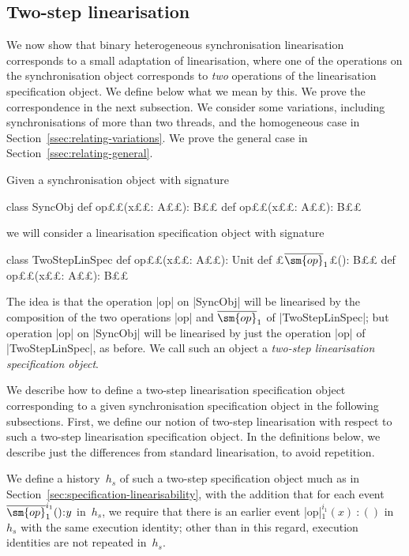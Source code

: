 
\subsection{Two-step linearisation}

We now show that binary heterogeneous synchronisation linearisation
corresponds to a small adaptation of linearisation, where one of the
operations on the synchronisation object corresponds to \emph{two} operations
of the linearisation specification object.  We define below what we mean by
this.  We prove the correspondence in the next subsection.  We consider some
variations, including synchronisations of more than two threads, and the
homogeneous case in Section~\ref{ssec:relating-variations}.  We prove the
general case in Section~\ref{ssec:relating-general}.

Given a synchronisation object with signature
\begin{scala}
class SyncObj{
  def op££(x££: A££): B££
  def op££(x££: A££): B££
}
\end{scala}
we will consider a linearisation specification object with signature
%
\begin{scala}
class TwoStepLinSpec{
  def op££(x££: A££): Unit
  def £$\overline{\sm{op}}_1$£(): B££
  def op££(x££: A££): B££
}
\end{scala}
%
The idea is that the operation |op| on |SyncObj| will be linearised by the
composition of the two operations |op| and $\overline{\sm{op}}_1$ of
|TwoStepLinSpec|; but operation |op| on |SyncObj| will be linearised by
just the operation |op| of |TwoStepLinSpec|, as before.  We call such an
object a \emph{two-step linearisation specification object}.  

We describe how to define a two-step linearisation specification object
corresponding to a given synchronisation specification object in the following
subsections.  First, we define our notion of two-step linearisation with
respect to such a two-step linearisation specification object.  In the
definitions below, we describe just the differences from standard
linearisation, to avoid repetition.

We define a history~$h_s$ of such a
two-step specification object much as in
Section~\ref{sec:specification-linearisability}, with the addition that for
each event $\overline{\sm{op}}_1^{i_1}()\::y$ in~$h_s$, we require that there is
an earlier event |op|$_1^{i_1}(x)\::()$ in~$h_s$ with the same execution
identity; other than in this regard, execution identities are not repeated
in~$h_s$.

